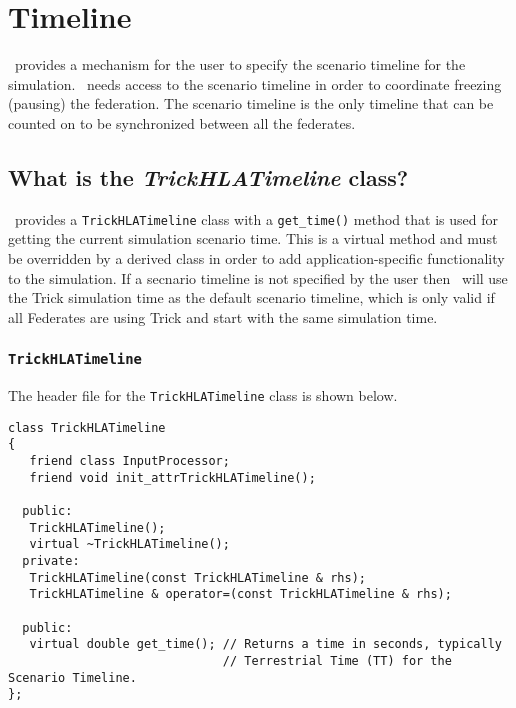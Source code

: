 \chapter{Timeline}
\label{sec:timeline}

\TrickHLA\ provides a mechanism for the user to specify the scenario timeline
for the simulation. \TrickHLA\ needs access to the scenario timeline in order
to coordinate freezing (pausing) the federation. The scenario timeline is the
only timeline that can be counted on to be synchronized between all the federates.

\section{What is the {\em TrickHLATimeline} class?}

\TrickHLA\ provides a {\tt TrickHLATimeline} class with a {\tt get\_time()} 
method that is used for getting the current simulation scenario time. This is
a virtual method and must be overridden by a derived class in order to add 
application-specific functionality to the simulation. If a secnario timeline
is not specified by the user then \TrickHLA\ will use the Trick simulation time
as the default scenario timeline, which is only valid if all Federates are using
Trick and start with the same simulation time.

\subsection{{\tt TrickHLATimeline}}

The header file for the {\tt TrickHLATimeline} class is shown below.

\begin{lstlisting}[caption={{\tt TrickHLATimeline} class header}]
class TrickHLATimeline
{
   friend class InputProcessor;
   friend void init_attrTrickHLATimeline();

  public:
   TrickHLATimeline();
   virtual ~TrickHLATimeline();
  private:
   TrickHLATimeline(const TrickHLATimeline & rhs);
   TrickHLATimeline & operator=(const TrickHLATimeline & rhs);

  public:
   virtual double get_time(); // Returns a time in seconds, typically
                              // Terrestrial Time (TT) for the Scenario Timeline.
};
\end{lstlisting}

